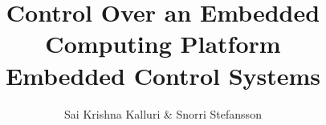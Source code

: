 \documentclass{article}
\begin{document}
\title{ {\fontsize{16}{1} \selectfont Control Over an Embedded Computing Platform} {\\ \fontsize{13}{1} \selectfont \textbf{Embedded Control Systems}} }
\author{Sai Krishna Kalluri \& Snorri Stefansson }

\maketitle









\printbibliography
\end{document}
